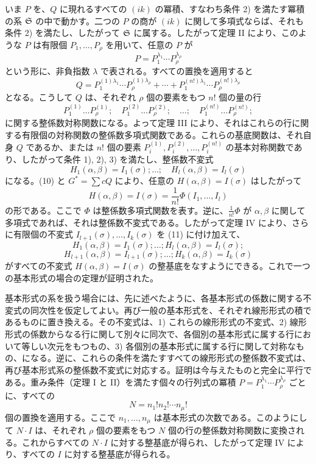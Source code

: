いま \(P\) を、\(Q\) に現れるすべての \((ik)\) の冪積、すなわち条件 2) を満たす冪積の系 \(\mathfrak S\) の中で動かす。二つの \(P\) の商が \((ik)\) に関して多項式ならば、それも条件 2) を満たし、したがって \(\mathfrak S\) に属する。したがって定理 II により、このような \(P\) は有限個 \(P_1,\ldots,P_\rho\) を用いて、任意の \(P\) が
\[
        P=P_1^{\lambda_1}\cdots P_\rho^{\lambda_\rho}
\]
という形に、非負指数 \(\lambda\) で表される。すべての置換を適用すると
\[
        Q=
        P_1^{(1)\lambda_1}\cdots P_\rho^{(1)\lambda_\rho}
        +\cdots+
        P_1^{(n!)\lambda_1}\cdots P_\rho^{(n!)\lambda_\rho}
\]
となる。こうして \(Q\) は、それぞれ \(\rho\) 個の要素をもつ \(n!\) 個の量の行
\[
        P_1^{(1)}\ldots P_\rho^{(1)};
        \quad
        P_1^{(2)}\ldots P_\rho^{(2)};
        \quad \ldots;\quad
        P_1^{(n!)}\ldots P_\rho^{(n!)};
\]
に関する整係数対称関数になる。よって定理 III により、それはこれらの行に関する有限個の対称関数の整係数多項式関数である。これらの基底関数は、それ自身 \(Q\) であるか、または \(n!\) 個の要素 \(P_i^{(1)},P_i^{(2)},\ldots,P_i^{(n!)}\) の基本対称関数であり、したがって条件 1), 2), 3) を満たし、整係数不変式
\begin{equation}
        H_1(\alpha,\beta)=I_1(\sigma);\ldots;\quad
        H_l(\alpha,\beta)=I_l(\sigma)
\end{equation}
になる。(10) と \(G^*=\sum cQ\) により、任意の \(H(\alpha,\beta)=I(\sigma)\) はしたがって
\[
        H(\alpha,\beta)=I(\sigma)=\frac1{n!}\Phi(I_1,\ldots,I_l)
\]
の形である。ここで \(\Phi\) は整係数多項式関数を表す。逆に、\(\frac1{n!}\Phi\) が \(\alpha,\beta\) に関して多項式であれば、それは整係数不変式である。したがって定理 IV により、さらに有限個の不変式 \(I_{l+1}(\sigma),\ldots,I_k(\sigma)\) を (11) に付け加えて、
\[
        H_1(\alpha,\beta)=I_1(\sigma);\ldots;H_l(\alpha,\beta)=I_l(\sigma);
\]
\[
        H_{l+1}(\alpha,\beta)=I_{l+1}(\sigma);\ldots;H_k(\alpha,\beta)=I_k(\sigma)
\]
がすべての不変式 \(H(\alpha,\beta)=I(\sigma)\) の整基底をなすようにできる。これで一つの基本形式の場合の定理が証明された。

基本形式の系を扱う場合には、先に述べたように、各基本形式の係数に関する不変式の同次性を仮定してよい。再び一般の基本形式を、それぞれ線形形式の積であるものに置き換える。その不変式は、1) これらの線形形式の不変式、2) 線形形式の係数からなる行に関して別々に同次で、各個別の基本形式に属する行において等しい次元をもつもの、3) 各個別の基本形式に属する行に関して対称なもの、になる。逆に、これらの条件を満たすすべての線形形式の整係数不変式は、再び基本形式系の整係数不変式に対応する。証明は今与えたものと完全に平行である。重み条件（定理 I と II）を満たす個々の行列式の冪積 \(P=P_1^{\lambda_1}\cdots P_\rho^{\lambda_\rho}\) ごとに、すべての
\[
        N=n_1!n_2!\cdots n_\mu!
\]
個の置換を適用する。ここで \(n_1,\ldots,n_\mu\) は基本形式の次数である。このようにして \(N\cdot I\) は、それぞれ \(\rho\) 個の要素をもつ \(N\) 個の行の整係数対称関数に変換される。これからすべての \(N\cdot I\) に対する整基底が得られ、したがって定理 IV により、すべての \(I\) に対する整基底が得られる。

